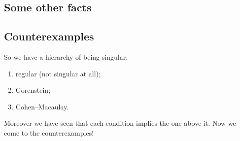 \documentclass[10pt,a4paper]{article}
\begin{document}
\subsection{Some other facts}

\subsection{Counterexamples}
So we have a hierarchy of being singular:
\begin{enumerate}
  \item regular (not singular at all);
  \item Gorenstein;
  \item Cohen--Macaulay.
\end{enumerate}
Moreover we have seen that each condition implies the one above it. Now we come to the counterexamples!
\end{document}
